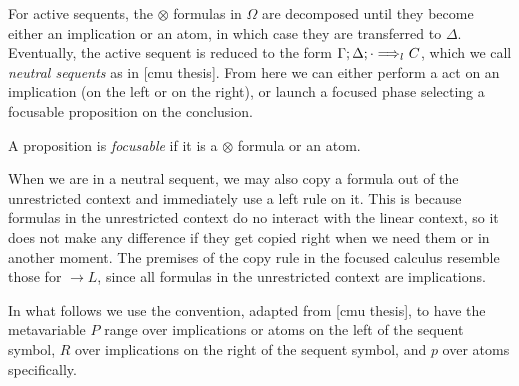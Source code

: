 For active sequents, the $\otimes$ formulas in $\Omega$ are decomposed until
they become either an implication or an atom, in which case they are transferred
to $\Delta$. Eventually, the active sequent is reduced to the form
$\Gamma; \Delta; \cdot \Longrightarrow_{l_{}} C$, which we call
\emph{neutral sequents} as in [cmu thesis]. From here we can either perform a
act on an implication (on the left or on the right), or launch a focused phase
selecting a focusable proposition on the conclusion.

\begin{definition}
  A proposition is \emph{focusable} if it is a $\otimes$ formula or an atom.
\end{definition}

When we are in a neutral sequent, we may also copy a formula out of the
unrestricted context and immediately use a left rule on it. This is because
formulas in the unrestricted context do no interact with the linear context, so
it does not make any difference if they get copied right when we need them or in
another moment. The premises of the copy rule in the focused calculus resemble
those for $\rightarrow L$, since all formulas in the unrestricted context are
implications.

In what follows we use the convention, adapted from [cmu thesis], to have the
metavariable $P$ range over implications or atoms on the left of the sequent
symbol, $R$ over implications on the right of the sequent symbol, and $p$ over
atoms specifically.

